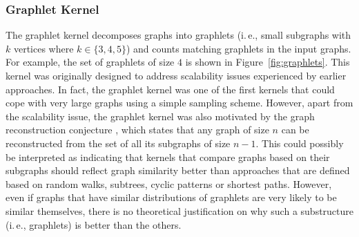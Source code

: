 \documentclass[twoside,11pt]{article}
\newcommand{\ie}{i.\,e., }
\begin{document}
\subsubsection{Graphlet Kernel}
The graphlet kernel decomposes graphs into graphlets (\ie small subgraphs with $k$ vertices where $k \in \{ 3,4,5\}$)  and counts matching graphlets in the input graphs.
For example, the set of graphlets of size $4$ is shown in Figure~\ref{fig:graphlets}.
This kernel was originally designed to address scalability issues experienced by earlier approaches.
In fact, the graphlet kernel was one of the first kernels that could cope with very large graphs using a simple sampling scheme.
However, apart from the scalability issue, the graphlet kernel was also motivated by the graph reconstruction conjecture , which states that any graph of size $n$ can be reconstructed from the set of all its subgraphs of size $n-1$.
This could possibly be interpreted as indicating that kernels that compare graphs based on their subgraphs should reflect graph similarity better than approaches that are defined based on random walks, subtrees, cyclic patterns or shortest paths.
However, even if graphs that have similar distributions of graphlets are very likely to be similar themselves, there is no theoretical justification on why such a substructure (\ie graphlets) is better than the others.
\end{document}

